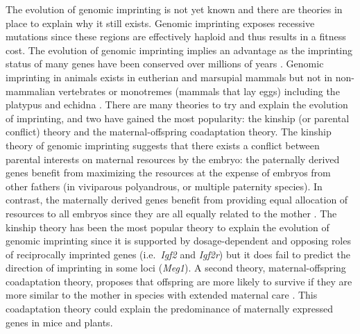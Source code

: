 The evolution of genomic imprinting is not yet known and there are theories in place to explain why it still exists. Genomic imprinting exposes recessive mutations since these regions are effectively haploid and thus results in a fitness cost. The evolution of genomic imprinting implies an advantage as the imprinting status of many genes have been conserved over millions of years \citep{Morison2005,Pires2014}. Genomic imprinting in animals exists in eutherian and marsupial mammals but not in non-mammalian vertebrates or monotremes (mammals that lay eggs) including the platypus and echidna \citep{Jirtle:2007jm,Pires2014}. There are many theories to try and explain the evolution of imprinting, and two have gained the most popularity: the kinship (or parental conflict) theory and the maternal-offspring coadaptation theory. The kinship theory of genomic imprinting suggests that there exists a conflict between parental interests on maternal resources by the embryo: the paternally derived genes benefit from maximizing the resources at the expense of embryos from other fathers (in viviparous polyandrous, or multiple paternity species). In contrast, the maternally derived genes benefit from providing equal allocation of resources to all embryos since they are all equally related to the mother \citep{Pires2014}. The kinship theory has been the most popular theory to explain the evolution of genomic imprinting since it is supported by dosage-dependent and opposing roles of reciprocally imprinted genes (i.e.~\emph{Igf2} and \emph{Igf2r}) but it does fail to predict the direction of imprinting in some loci (\emph{Meg1}). A second theory, maternal-offspring coadaptation theory, proposes that offspring are more likely to survive if they are more similar to the mother in species with extended maternal care \citep{Pires2014}. This coadaptation theory could explain the predominance of maternally expressed genes in mice and plants. 

